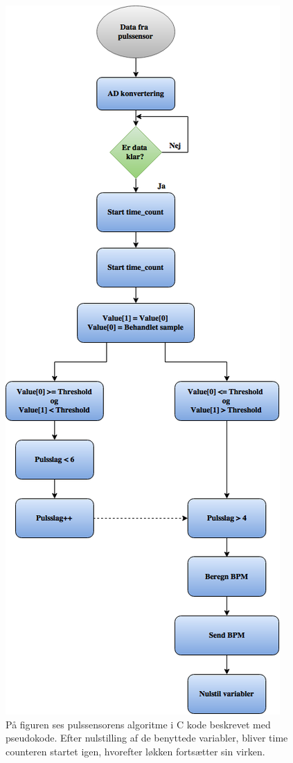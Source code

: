 \begin{figure}[H]
	\centering
	\includegraphics[scale=0.5]{figures/cDesign/Puls_ckode.png}
	\caption{På figuren ses pulssensorens algoritme i C kode beskrevet med pseudokode. Efter nulstilling af de benyttede variabler, bliver time counteren startet igen, hvorefter løkken fortsætter sin virken.}
	\label{fig:puls_pseudo_c}
\end{figure} \vspace{-0.5cm}

